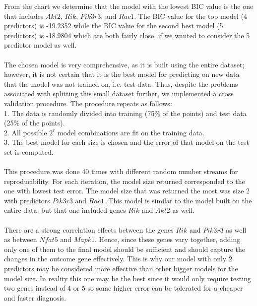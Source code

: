 \documentclass{article}
\begin{document}
From the chart we determine that the model with the lowest BIC value is the one that includes $Akt2$, $Rik$, $Pik3r3$, and $Rac1$.  The BIC value for the top model (4 predictors) is  -19.2352 while the BIC value for the second best model (5 predictors) is -18.9804 which are both fairly close, if we wanted to consider the 5 predictor model as well.\\
\null\\
The chosen model is very comprehensive, as it is built using the entire dataset; however, it is not certain that it is the best model for predicting on new data that the model was not trained on, i.e. test data.  Thus, despite the problems associated with splitting this small dataset further, we implemented a cross validation procedure. The procedure repeats as follows:\\
1. The data is randomly divided into training (75\% of the points) and test data (25\% of the points).\\
2. All possible $2^r$ model combinations are fit on the training data.\\
3. The best model for each size is chosen and the error of that model on the test set is computed. \\
\null\\
This procedure was done 40 times with different random number streams for reproducibility.  For each iteration, the model size returned corresponded to the one with lowest test error.  The model size that was returned the most was size 2 with predictors $Pik3r3$ and $Rac1$. This model is similar to the model built on the entire data, but that one included genes $Rik$ and $Akt2$ as well.\\
\null\\
There are a strong correlation effects between the genes $Rik$ and $Pik3r3$ as well as between $Nfat5$ and $Mapk1$. Hence, since these genes vary together, adding only one of them to the final model should be sufficient and should capture the changes in the outcome gene effectively. This is why our model with only 2 predictors may be considered more effective than other bigger models for the model size.  In reality this one may be the best since it would only require testing two genes instead of 4 or 5 so some higher error can be tolerated for a cheaper and faster diagnosis.
%
\end{document}
